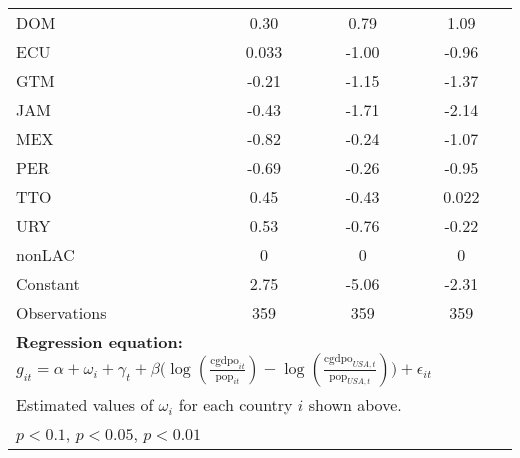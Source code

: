 \begin{sidewaystable}[htbp]
\begin{tabular}{l*{3}{c}}
DOM             &     0.30\sym{**} &     0.79\sym{***}&     1.09\sym{***}\\
ECU             &    0.033         &    -1.00\sym{***}&    -0.96\sym{***}\\
GTM             &    -0.21         &    -1.15\sym{***}&    -1.37\sym{***}\\
JAM             &    -0.43\sym{***}&    -1.71\sym{***}&    -2.14\sym{***}\\
MEX             &    -0.82\sym{***}&    -0.24         &    -1.07\sym{**} \\
PER             &    -0.69\sym{***}&    -0.26         &    -0.95\sym{**} \\
TTO             &     0.45\sym{***}&    -0.43         &    0.022         \\
URY             &     0.53\sym{***}&    -0.76\sym{***}&    -0.22         \\
nonLAC          &        0         &        0         &        0         \\
Constant        &     2.75\sym{**} &    -5.06\sym{**} &    -2.31         \\
\midrule
Observations    &      359         &      359         &      359         \\
\bottomrule
\multicolumn{4}{l}{\footnotesize \textbf{Regression equation:} \(g_{it} = \alpha  + \omega_i + \gamma_t + \beta \big(\log (\frac{\textrm{cgdpo}_{it}}{\textrm{pop}_{it}} ) - \log (\frac{\textrm{cgdpo}_{USA,t}}{\textrm{pop}_{USA,t}}  ) \big) + \epsilon_{it}\)}\\
\multicolumn{4}{l}{\footnotesize Estimated values of \(\omega_i\) for each country \(i\) shown above.}\\
\multicolumn{4}{l}{\footnotesize \sym{*} \(p<0.1\), \sym{**} \(p<0.05\), \sym{***} \(p<0.01\)}\\
\end{tabular}
\end{sidewaystable}
